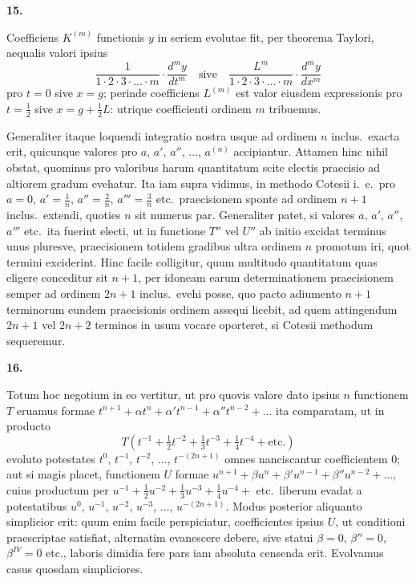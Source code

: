 \documentclass[12pt,a4paper]{article}
\newcommand{\art}[1]{\par\medskip\noindent\textbf{#1.}\par\nopagebreak\smallskip}
\begin{document}
\art{15}

Coefficiens $K^{(m)}$ functionis $y$ in seriem evolutae fit, per theorema Taylori, aequalis valori ipsius
\[
\frac{1}{1\cdot2\cdot3\cdot\ldots\cdot m}\cdot\frac{d^m y}{dt^m}\quad \text{sive}\quad \frac{L^m}{1\cdot2\cdot3\cdot\ldots\cdot m}\cdot\frac{d^m y}{dx^m}
\]
pro $t=0$ sive $x=g$; perinde coefficiens $L^{(m)}$ est valor eiusdem expressionis pro $t=\frac{1}{2}$ sive $x=g+\frac{1}{2}L$: utrique coefficienti ordinem $m$ tribuemus.

Generaliter itaque loquendi integratio nostra usque ad ordinem $n$ inclus.\ exacta erit, quicunque valores pro $a$, $a'$, $a''$, $\ldots$, $a^{(n)}$ accipiantur. Attamen hinc nihil obstat, quominus pro valoribus harum quantitatum scite electis praecisio ad altiorem gradum evehatur. Ita iam supra vidimus, in methodo Cotesii i.\ e.\ pro $a=0$, $a'=\frac{1}{n}$, $a''=\frac{2}{n}$, $a'''=\frac{3}{n}$ etc.\ praecisionem sponte ad ordinem $n+1$ inclus.\ extendi, quoties $n$ sit numerus par. Generaliter patet, si valores $a$, $a'$, $a''$, $a'''$ etc.\ ita fuerint electi, ut in functione $T''$ vel $U''$ ab initio excidat terminus unus pluresve, praecisionem totidem gradibus ultra ordinem $n$ promotum iri, quot termini exciderint. Hinc facile colligitur, quum multitudo quantitatum quas eligere conceditur sit $n+1$, per idoneam earum determinationem praecisionem semper ad ordinem $2n+1$ inclus.\ evehi posse, quo pacto adiumento $n+1$ terminorum eundem praecisionis ordinem assequi licebit, ad quem attingendum $2n+1$ vel $2n+2$ terminos in usum vocare oporteret, si Cotesii methodum sequeremur.

\art{16}

Totum hoc negotium in eo vertitur, ut pro quovis valore dato ipsius $n$ functionem $T$ eruamus formae $t^{n+1}+\alpha t^n+\alpha't^{n-1}+\alpha''t^{n-2}+\ldots$ ita comparatam, ut in producto
\[
T(t^{-1} + \tfrac{1}{2}t^{-2} + \tfrac{1}{3}t^{-3} + \tfrac{1}{4}t^{-4} + \text{etc.})
\]
evoluto potestates $t^0$, $t^{-1}$, $t^{-2}$, $\ldots$, $t^{-(2n+1)}$ omnes nanciscantur coefficientem $0$; aut si magis placet, functionem $U$ formae $u^{n+1}+\beta u^n+\beta'u^{n-1}+\beta''u^{n-2}+\ldots$, cuius productum per $u^{-1}+\frac{1}{2}u^{-2}+\frac{1}{3}u^{-3}+\frac{1}{4}u^{-4}+$ etc.\ liberum evadat a potestatibus $u^0$, $u^{-1}$, $u^{-2}$, $u^{-3}$, $\ldots$, $u^{-(2n+1)}$. Modus posterior aliquanto simplicior erit: quum enim facile perspiciatur, coefficientes ipsius $U$, ut conditioni praescriptae satisfiat, alternatim evanescere debere, sive statui $\beta=0$, $\beta''=0$, $\beta^{IV}=0$ etc., laboris dimidia fere pars iam absoluta censenda erit. Evolvamus casus quosdam simpliciores.
\end{document}
